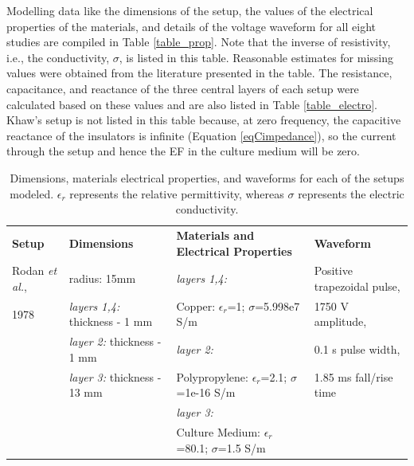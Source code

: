 Modelling data like the dimensions of the setup, the values of the electrical properties of the materials, and details of the voltage waveform for all eight studies are compiled in Table \ref{table_prop}. Note that the inverse of resistivity, i.e., the conductivity, $\sigma$, is listed in this table. Reasonable estimates for missing values were obtained from the literature presented in the table. The resistance, capacitance, and reactance of the three central layers of each setup were calculated based on these values and are also listed in Table \ref{table_electro}. Khaw's setup is not listed in this table because, at zero frequency, the capacitive reactance of the insulators is infinite (Equation \ref{eqCimpedance}), so the current through the setup and hence the \acs{EF} in the culture medium will be zero.


\begin{table}[p]
\caption{Dimensions, materials electrical properties, and waveforms for each of the setups modeled. $\epsilon_{r}$ represents the relative permittivity, whereas $\sigma$ represents the electric conductivity.}
\bigskip
\tiny
\centering
\begin{tabularx}{\textwidth}{l l l l} \toprule[0.15em]
\textbf{Setup} & \textbf{Dimensions} & \textbf{Materials and Electrical Properties} & \textbf{Waveform} \\ \cmidrule(l){1-4}

Rodan \textit{et al.}, & radius: 15\si{\milli\meter} & \textit{layers 1,4:} 	& Positive trapezoidal pulse,\\
1978 \cite{Rodan1978-yu} & \textit{layers 1,4:} thickness - 1 \si{\milli\meter} & Copper: $\epsilon_{r}$=1; $\sigma$=5.998e7 S/m & 1750 \si{\volt} amplitude,\\
& \textit{layer 2:} thickness - 1 \si{\milli\meter} & \textit{layer 2:} & 0.1 \si{\second} pulse width,\\
& \textit{layer 3:} thickness - 13 \si{\milli\meter} & Polypropylene: $\epsilon_{r}$=2.1; $\sigma$=1e-16 S/m \cite{IneosPP} & 1.85 \si{\milli\second} fall/rise time \\
&  & \textit{layer 3:} &\\
&  & Culture Medium: $\epsilon_{r}$=80.1; $\sigma$=1.5 S/m \cite{Visone2018-sa} & \\ \cmidrule(l){1-4}



\end{tabularx}
\end{table}
